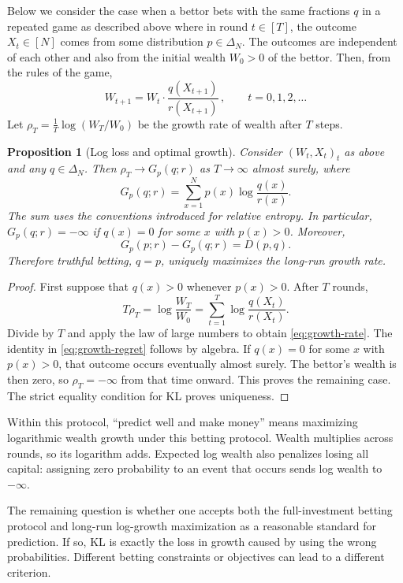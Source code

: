 \documentclass[11pt,twoside]{article}
\newcommand{\KL}{D}
\newtheorem{proposition}[theorem]{Proposition}
\theoremstyle{definition}
\theoremstyle{remark}
\begin{document}
Below we consider the case when a bettor bets with the same fractions $q$
in a repeated game as described above where in round $t\in [T]$,
the outcome $X_t\in [N]$ comes
from some distribution $p\in \Delta_N$. The outcomes are independent of each
other and also from the initial wealth $W_0>0$ of the bettor.
Then, from the rules of the game,
\[
W_{t+1} = W_t \cdot \frac{q(X_{t+1})}{r(X_{t+1})}\,, \qquad t=0,1,2,\dots
\]
Let $\rho_T = \frac1T \log (W_T/W_0)$ be the growth rate of wealth after $T$ steps.
\begin{proposition}[Log loss and optimal growth]
\label{prop:kelly}
Consider $(W_t,X_t)_t$ as above and any $q\in\Delta_N$. Then
$\rho_T \to G_p(q;r)$ as $T\to \infty$ almost surely, where
\begin{equation}
G_p(q;r)
=\sum_{x=1}^N p(x)\log\frac{q(x)}{r(x)}.
\label{eq:growth-rate}
\end{equation}
The sum uses the conventions introduced for relative entropy. In particular,
$G_p(q;r)=-\infty$ if $q(x)=0$ for some $x$ with $p(x)>0$.
Moreover,
\begin{equation}
G_p(p;r)-G_p(q;r)=\KL(p, q).
\label{eq:growth-regret}
\end{equation}
Therefore truthful betting, $q=p$, uniquely maximizes the long-run growth rate.
\end{proposition}

\begin{proof}
First suppose that $q(x)>0$ whenever $p(x)>0$. After $T$ rounds,
\begin{equation}
T\rho_T =  \log\frac{W_T}{W_0}
=\sum_{t=1}^T\log\frac{q(X_t)}{r(X_t)}.
\label{eq:cumulative-wealth}
\end{equation}
Divide by $T$ and apply the law of large numbers to obtain
\cref{eq:growth-rate}.
The identity in \cref{eq:growth-regret} follows by algebra.
If $q(x)=0$ for some $x$ with $p(x)>0$, that outcome occurs eventually almost
surely. The bettor's wealth is then zero, so $\rho_T=-\infty$ from that time
onward. This proves the remaining case. The strict equality condition for KL
proves uniqueness.
\end{proof}

Within this protocol, ``predict well and make money'' means
maximizing logarithmic wealth growth under this betting protocol. Wealth
multiplies across rounds, so its logarithm adds. Expected log wealth also
penalizes losing all capital: assigning zero probability to an event that
occurs sends log wealth to $-\infty$.

The remaining question is whether one accepts both the full-investment betting
protocol and long-run log-growth maximization as a reasonable standard for
prediction. If so, KL is exactly the loss in growth caused by using the wrong
probabilities. Different betting constraints or objectives can lead to a
different criterion.
\end{document}
